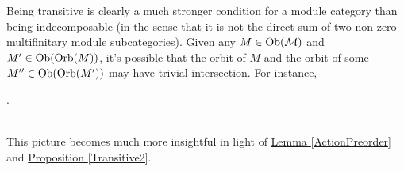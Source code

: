 \noindent Being transitive is clearly a much stronger condition for a module category than being indecomposable (in the sense that it is not the direct sum of two non-zero multifinitary module subcategories). Given any $M \in \textup{Ob}(\mathcal{M})$ and $M' \in \textup{Ob}(\textup{Orb}(M))$, it's possible that the orbit of $M$ and the orbit of some $M'' \in \textup{Ob}(\textup{Orb}(M'))$ may have trivial intersection. For instance,\\[-0.5\linespacing]
\begin{center}
.
\end{center}
\noindent\\ This picture becomes much more insightful in light of \hyperref[ActionPreorder]{Lemma \ref*{ActionPreorder}} and \hyperref[Transitive2]{Proposition \ref*{Transitive2}}.\\



